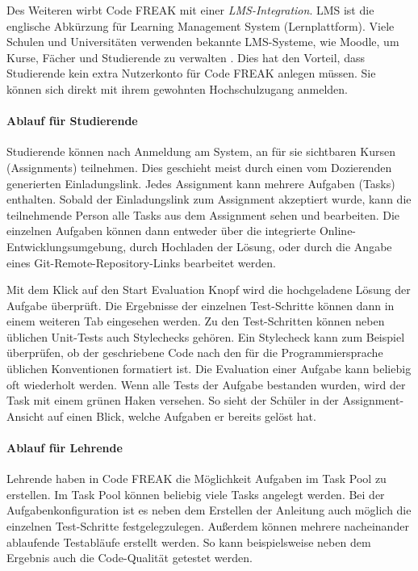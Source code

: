 Des Weiteren wirbt Code FREAK mit einer \emph{LMS-Integration}. LMS ist die
englische Abkürzung für Learning Management System (Lernplattform). Viele
Schulen und Universitäten verwenden bekannte LMS-Systeme, wie Moodle, um Kurse,
Fächer und Studierende zu verwalten \parencite{moodle}. Dies hat den Vorteil,
dass Studierende kein extra Nutzerkonto für Code FREAK anlegen müssen. Sie
können sich direkt mit ihrem gewohnten Hochschulzugang anmelden.

\paragraph{Ablauf für Studierende}
Studierende können nach Anmeldung am System, an für sie sichtbaren Kursen
(Assignments) teilnehmen. Dies geschieht meist durch einen vom Dozierenden
generierten Einladungslink. Jedes Assignment kann mehrere Aufgaben (Tasks)
enthalten. Sobald der Einladungslink zum Assignment akzeptiert
wurde, kann die teilnehmende Person alle Tasks aus dem Assignment sehen und
bearbeiten. Die einzelnen Aufgaben können dann entweder über die integrierte
Online-Entwicklungsumgebung, durch Hochladen der Lösung, oder durch die Angabe
eines Git-Remote-Repository-Links bearbeitet werden.

Mit dem Klick auf den \glqq Start Evaluation\grqq{} Knopf wird die hochgeladene
Lösung der Aufgabe überprüft. Die Ergebnisse der einzelnen Test-Schritte können
dann in einem weiteren Tab eingesehen werden. Zu den Test-Schritten können neben
üblichen Unit-Tests auch Stylechecks gehören. Ein Stylecheck kann zum Beispiel
überprüfen, ob der geschriebene Code nach den für die Programmiersprache
üblichen Konventionen formatiert ist. Die Evaluation einer Aufgabe kann beliebig
oft wiederholt werden. Wenn alle Tests der Aufgabe bestanden wurden, wird der
Task mit einem grünen Haken versehen. So sieht der Schüler in der
Assignment-Ansicht auf einen Blick, welche Aufgaben er bereits gelöst hat.

\paragraph{Ablauf für Lehrende}
Lehrende haben in Code FREAK die Möglichkeit Aufgaben im Task Pool zu
erstellen. Im Task Pool können beliebig viele Tasks angelegt werden. Bei der
Aufgabenkonfiguration ist es neben dem Erstellen der Anleitung auch möglich die
einzelnen Test-Schritte festgelegzulegen. Außerdem können mehrere nacheinander
ablaufende Testabläufe erstellt werden. So kann beispielsweise neben dem
Ergebnis auch die Code-Qualität getestet werden.

